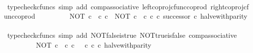 \begin{isabellebody}
\ \ \ \ \ \ \isamarkupfalse%
\ {\isacharparenleft}{\kern0pt}typecheck{\isacharunderscore}{\kern0pt}cfuncs{\isacharcomma}{\kern0pt}\ simp\ add{\isacharcolon}{\kern0pt}\ comp{\isacharunderscore}{\kern0pt}associative{}\ left{\isacharunderscore}{\kern0pt}coproj{\isacharunderscore}{\kern0pt}cfunc{\isacharunderscore}{\kern0pt}coprod\ right{\isacharunderscore}{\kern0pt}coproj{\isacharunderscore}{\kern0pt}cfunc{\isacharunderscore}{\kern0pt}coprod{\isacharparenright}{\kern0pt}\isanewline
\ \ \ \ \isamarkupfalse%
\ \isamarkupfalse%
\ {\isachardoublequoteopen}{\isachardot}{\kern0pt}{\isachardot}{\kern0pt}{\isachardot}{\kern0pt}\ {\isacharequal}{\kern0pt}\ {\isacharparenleft}{\kern0pt}{\isacharparenleft}{\kern0pt}NOT\ {\isasymcirc}\isactrlsub c\ {\isasymt}\ {\isasymcirc}\isactrlsub c\ {\isasymbeta}\isactrlbsub {\isasymnat}\isactrlsub c\isactrlesub {\isacharparenright}{\kern0pt}\ {\isasymamalg}\ {\isacharparenleft}{\kern0pt}NOT\ {\isasymcirc}\isactrlsub c\ {\isasymf}\ {\isasymcirc}\isactrlsub c\ {\isasymbeta}\isactrlbsub {\isasymnat}\isactrlsub c\isactrlesub \ {\isasymcirc}\isactrlsub c\ successor{\isacharparenright}{\kern0pt}{\isacharparenright}{\kern0pt}\ {\isasymcirc}\isactrlsub c\ halve{\isacharunderscore}{\kern0pt}with{\isacharunderscore}{\kern0pt}parity{\isachardoublequoteclose}\isanewline
\ \ \ \ \ \ \isamarkupfalse%
\ {\isacharparenleft}{\kern0pt}typecheck{\isacharunderscore}{\kern0pt}cfuncs{\isacharcomma}{\kern0pt}\ simp\ add{\isacharcolon}{\kern0pt}\ NOT{\isacharunderscore}{\kern0pt}false{\isacharunderscore}{\kern0pt}is{\isacharunderscore}{\kern0pt}true\ NOT{\isacharunderscore}{\kern0pt}true{\isacharunderscore}{\kern0pt}is{\isacharunderscore}{\kern0pt}false\ comp{\isacharunderscore}{\kern0pt}associative{}{\isacharparenright}{\kern0pt}\isanewline
\ \ \ \ \isamarkupfalse%
\ \isamarkupfalse%
\ {\isachardoublequoteopen}{\isachardot}{\kern0pt}{\isachardot}{\kern0pt}{\isachardot}{\kern0pt}\ {\isacharequal}{\kern0pt}\ NOT\ {\isasymcirc}\isactrlsub c\ {\isacharparenleft}{\kern0pt}{\isasymt}\ {\isasymcirc}\isactrlsub c\ {\isasymbeta}\isactrlbsub {\isasymnat}\isactrlsub c\isactrlesub {\isacharparenright}{\kern0pt}\ {\isasymamalg}\ {\isacharparenleft}{\kern0pt}{\isasymf}\ {\isasymcirc}\isactrlsub c\ {\isasymbeta}\isactrlbsub {\isasymnat}\isactrlsub c\isactrlesub {\isacharparenright}{\kern0pt}\ {\isasymcirc}\isactrlsub c\ halve{\isacharunderscore}{\kern0pt}with{\isacharunderscore}{\kern0pt}parity{\isachardoublequoteclose}\isanewline
\ \ \ \ \ \ \isamarkupfalse%

\end{isabellebody}
